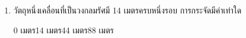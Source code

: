 \begin{enumerate}
	\item  \nonet  วัตถุหนึ่งเคลื่อนที่เป็นวงกลมรัศมี   14  เมตรครบหนึ่งรอบ   การกระจัดมีค่าเท่าใด \runningj
	\begin{4c}
		{0 เมตร}{14 เมตร}{44 เมตร}{88 เมตร}
	\end{4c}
\end{enumerate}
